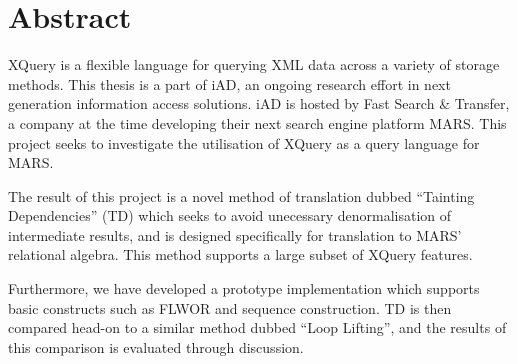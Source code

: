 \chapter*{Abstract}
XQuery is a flexible language for querying XML data across a variety of storage
methods. This thesis is a part of iAD, an ongoing research effort in
next generation information access solutions. iAD is hosted by Fast Search \&
Transfer, a company at the time developing their next search engine platform
MARS. This project seeks to investigate the utilisation of XQuery as a query
language for MARS.

The result of this project is a novel method of translation dubbed ``Tainting
Dependencies'' (TD) which seeks to avoid unecessary
denormalisation of intermediate results, and is designed specifically
for translation to MARS' relational algebra. This method supports a large subset of XQuery features.

Furthermore, we have developed a prototype implementation which supports basic
constructs such as FLWOR and sequence construction. TD is
then compared head-on to a similar method dubbed ``Loop Lifting'', and the
results of this comparison is evaluated through discussion.

% 
